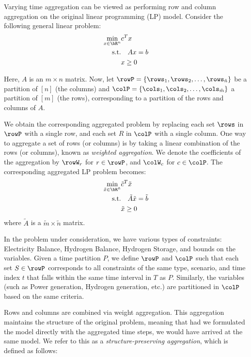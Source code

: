 {\color{violet}
Varying time aggregation can be viewed as performing row and column aggregation on the original linear programming (LP) model. Consider the following general linear problem:
\begin{align}
\label{eq:LP}
\min_{x \in \bR^{n}} &c^T x \\ 
\text{s.t.} &\quad Ax = b \\
&x \geq 0
\end{align}

Here, \(A\) is an \(m \times n\) matrix. Now, let \(\rowP = \{\rows_1, \rows_2, \ldots, \rows_{\tilde{n}}\}\) be a partition of \([n]\) (the columns) and \(\colP = \{\cols_1, \cols_2, \ldots, \cols_{\tilde{m}}\}\) a partition of \([m]\) (the rows), corresponding to a partition of the rows and columns of \(A\).

We obtain the corresponding aggregated problem by replacing each set \(\rows\) in \(\rowP\) with a single row, and each set \(R\) in \(\colP\) with a single column. 
One way to aggregate a set of rows (or columns) is by taking a linear combination of the rows (or columns), known as \emph{weighted aggregation}.
We denote the coefficients of the aggregation by \(\rowW_r\) for \(r \in \rowP\), and \(\colW_c\) for \(c \in \colP\).
The corresponding aggregated LP problem becomes:
\begin{align}
\label{eq:LPaggr}
\min_{\tilde{x} \in \bR^{\tilde{n}}} &\tilde{c}^T \tilde{x} \\ 
\text{s.t.} &\quad \tilde{A} \tilde{x} = \tilde{b} \\ 
&\tilde{x} \geq 0 
\end{align}
where \(\tilde{A}\) is a \(\tilde{m}\times \tilde{n}\) matrix.

In the problem under consideration, we have various types of constraints: Electricity Balance, Hydrogen Balance, Hydrogen Storage, and bounds on the variables. Given a time partition \(P\), we define \(\rowP\) and \(\colP\) such that each set \(S \in \rowP\) corresponds to all constraints of the same type, scenario, and time index \(t\) that falls within the same time interval in \(T\) as \(P\). Similarly, the variables (such as Power generation, Hydrogen generation, etc.) are partitioned in \(\colP\) based on the same criteria.

 Rows and columns are combined via weight aggregation. This aggregation maintains the structure of the original problem, 
meaning that had we formulated the model directly with the aggregated time steps, we would have arrived at the same model.
 We refer to this as a \emph{structure-preserving aggregation}, which is defined as follows:

}
